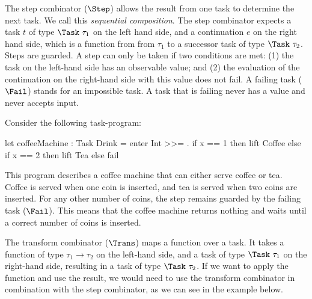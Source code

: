 The step combinator ($\Step$) allows the result from one task to determine the next task.
We call this \textit{sequential composition}.
The step combinator expects a task $t$ of type $\Task\ \tau_1$ on the left hand side,
and a continuation $e$ on the right hand side, which is a function from from $\tau_1$ to a successor task of type $\Task\ \tau_2$.
Steps are guarded.
A step can only be taken if two conditions are met: (1) the task on the left-hand side has an observable value;
and (2) the evaluation of the continuation on the right-hand side with this value does not fail.
A failing task ($\Fail$) stands for an impossible task.
A task that is failing never has a value and never accepts input.

  Consider the following task-program:
  \begin{TASK}
    let coffeeMachine : Task Drink = enter Int >>= \x.
      if x == 1 then lift Coffee else if x == 2 then lift Tea else fail
  \end{TASK}
  \noindent
  This program describes a coffee machine that can either serve coffee or tea.
  Coffee is served when one coin is inserted, and tea is served when two coins are inserted.
  For any other number of coins, the step remains guarded by the failing task ($\Fail$).
  This means that the coffee machine returns nothing and waits until a correct number of coins is inserted.
\stopexample

The transform combinator ($\Trans$) maps a function over a task.
It takes a function of type $\tau_1 \to \tau_2$ on the left-hand side,
and a task of type $\Task\ \tau_1$ on the right-hand side, resulting in a task of type $\Task\ \tau_2$.
If we want to apply the function and use the result, we would need to use the transform combinator in combination with the step combinator,
as we can see in the example below.

